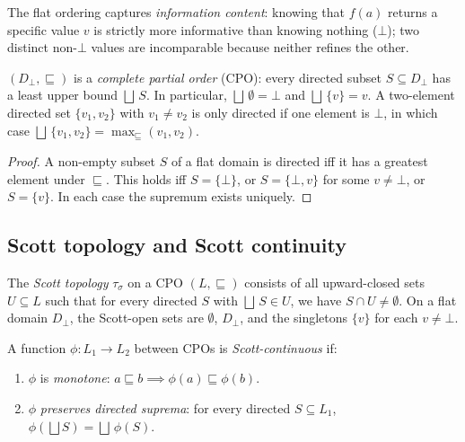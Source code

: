 \documentclass[11pt]{article}
\newcommand{\LiftD}[1]{#1_{\bot}}           %
\newcommand{\ScottTop}{\tau_{\!\sigma}}      %
\newcommand{\Apx}{\sqsubseteq}              %
\newcommand{\Lub}{\bigsqcup}               %
\begin{document}
The flat ordering captures \emph{information content}: knowing that
$f(a)$ returns a specific value $v$ is strictly more informative than
knowing nothing ($\bot$); two distinct non-$\bot$ values are
incomparable because neither refines the other.

\begin{proposition}\label{prop:cpo}
$(\LiftD{D}, \Apx)$ is a \emph{complete partial order} (CPO): every
directed subset $S \subseteq \LiftD{D}$ has a least upper bound
$\Lub\, S$.  In particular, $\Lub\,\emptyset = \bot$ and
$\Lub\,\{v\} = v$.  A two-element directed set $\{v_1, v_2\}$ with
$v_1 \neq v_2$ is only directed if one element is $\bot$, in which
case $\Lub\,\{v_1, v_2\} = \max_\Apx(v_1, v_2)$.
\end{proposition}

\begin{proof}
A non-empty subset $S$ of a flat domain is directed iff it has a
greatest element under $\Apx$.  This holds iff $S = \{\bot\}$, or
$S = \{\bot, v\}$ for some $v \neq \bot$, or $S = \{v\}$.  In each
case the supremum exists uniquely.
\end{proof}

\subsection{Scott topology and Scott continuity}

\begin{definition}\label{def:scott-top}
The \emph{Scott topology} $\ScottTop$ on a CPO $(L, \Apx)$ consists
of all upward-closed sets $U \subseteq L$ such that for every directed
$S$ with $\Lub\, S \in U$, we have $S \cap U \neq \emptyset$.  On a
flat domain $\LiftD{D}$, the Scott-open sets are $\emptyset$,
$\LiftD{D}$, and the singletons $\{v\}$ for each $v \neq \bot$.
\end{definition}

\begin{definition}\label{def:cont}
A function $\phi: L_1 \to L_2$ between CPOs is
\emph{Scott-continuous} if:
\begin{enumerate}[label=(\roman*)]
  \item $\phi$ is \emph{monotone}: $a \Apx b \implies \phi(a) \Apx \phi(b)$.
  \item $\phi$ \emph{preserves directed suprema}: for every directed
        $S \subseteq L_1$,
        $\phi\!\left(\Lub S\right) = \Lub\, \phi(S)$.
\end{enumerate}
\end{definition}
\end{document}
